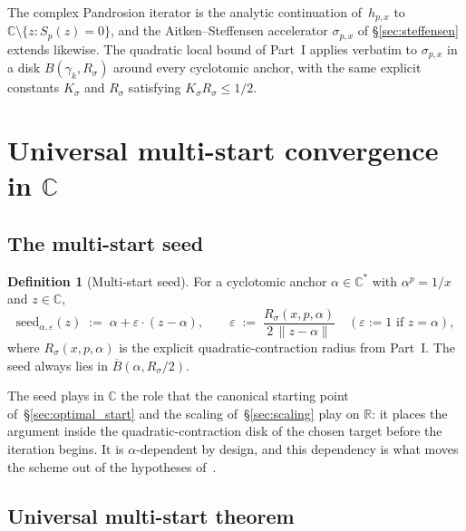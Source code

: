 \documentclass[11pt,a4paper]{article}
\theoremstyle{definition}
\newtheorem{definition}{Definition}[section]
\begin{document}
The complex Pandrosion iterator is the analytic continuation of~$h_{p,x}$ to $\mathbb{C} \setminus \{z : S_p(z) = 0\}$, and the Aitken--Steffensen accelerator $\sigma_{p,x}$ of \S\ref{sec:steffensen} extends likewise. The quadratic local bound of Part~I applies verbatim to $\sigma_{p,x}$ in a disk $B(\gamma_k, R_\sigma)$ around every cyclotomic anchor, with the same explicit constants $K_\sigma$ and $R_\sigma$ satisfying $K_\sigma R_\sigma \leq 1/2$.

\section{Universal multi-start convergence in $\mathbb{C}$}
\label{sec:multistart}

\subsection{The multi-start seed}
\label{sec:seed}

\begin{definition}[Multi-start seed]\label{def:seed}
For a cyclotomic anchor $\alpha \in \mathbb{C}^\ast$ with $\alpha^p = 1/x$
and $z \in \mathbb{C}$,
\begin{equation}\label{eq:multistart-seed}
  \mathrm{seed}_{\alpha, \varepsilon}(z)
  \;:=\; \alpha + \varepsilon \cdot (z - \alpha),
  \qquad
  \varepsilon
  \;:=\; \frac{R_\sigma(x, p, \alpha)}{2\,\|z - \alpha\|}
  \quad (\varepsilon := 1 \text{ if } z = \alpha),
\end{equation}
where $R_\sigma(x, p, \alpha)$ is the explicit quadratic-contraction
radius from Part~I. The seed always lies in $\overline{B}(\alpha, R_\sigma/2)$.
\end{definition}

The seed plays in $\mathbb{C}$ the role that the canonical starting point of~\S\ref{sec:optimal_start} and the scaling of~\S\ref{sec:scaling} play on $\mathbb{R}$: it places the argument inside the quadratic-contraction disk of the chosen target before the iteration begins. It is $\alpha$-dependent by design, and this dependency is what moves the scheme out of the hypotheses of~\cite{mcmullen}.

\subsection{Universal multi-start theorem}
\end{document}
